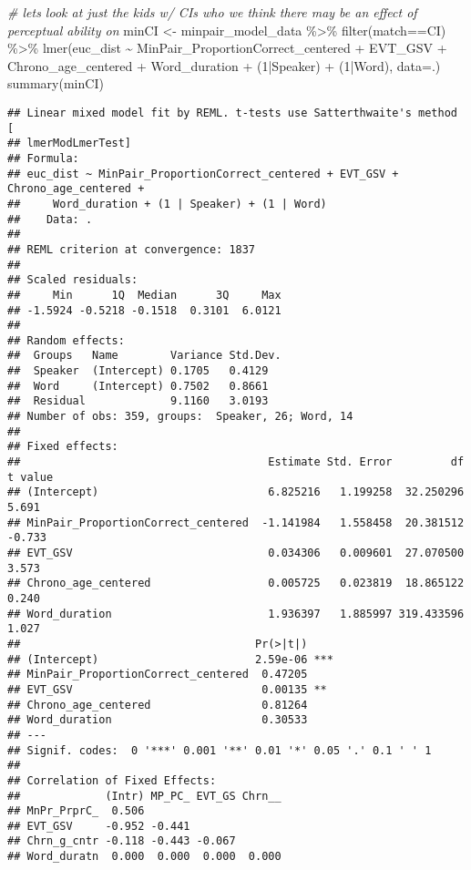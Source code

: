 \documentclass[
]{article}
\newenvironment{Shaded}{\begin{snugshade}}{\end{snugshade}}
\newcommand{\AttributeTok}[1]{\textcolor[rgb]{0.77,0.63,0.00}{#1}}
\newcommand{\CommentTok}[1]{\textcolor[rgb]{0.56,0.35,0.01}{\textit{#1}}}
\newcommand{\DecValTok}[1]{\textcolor[rgb]{0.00,0.00,0.81}{#1}}
\newcommand{\FunctionTok}[1]{\textcolor[rgb]{0.00,0.00,0.00}{#1}}
\newcommand{\NormalTok}[1]{#1}
\newcommand{\OtherTok}[1]{\textcolor[rgb]{0.56,0.35,0.01}{#1}}
\newcommand{\SpecialCharTok}[1]{\textcolor[rgb]{0.00,0.00,0.00}{#1}}
\newcommand{\StringTok}[1]{\textcolor[rgb]{0.31,0.60,0.02}{#1}}
\begin{document}
\begin{Shaded}
\begin{Highlighting}[]
\CommentTok{\# let\textquotesingle{}s look at just the kids w/ CIs who we think there may be an effect of perceptual ability on}
\NormalTok{minCI }\OtherTok{\textless{}{-}}\NormalTok{ minpair\_model\_data }\SpecialCharTok{\%\textgreater{}\%}
  \FunctionTok{filter}\NormalTok{(match}\SpecialCharTok{==}\StringTok{\textquotesingle{}CI\textquotesingle{}}\NormalTok{) }\SpecialCharTok{\%\textgreater{}\%}
  \FunctionTok{lmer}\NormalTok{(euc\_dist }\SpecialCharTok{\textasciitilde{}}\NormalTok{ MinPair\_ProportionCorrect\_centered }\SpecialCharTok{+} 
\NormalTok{         EVT\_GSV }\SpecialCharTok{+}
\NormalTok{         Chrono\_age\_centered }\SpecialCharTok{+} 
\NormalTok{         Word\_duration }\SpecialCharTok{+} 
\NormalTok{         (}\DecValTok{1}\SpecialCharTok{|}\NormalTok{Speaker) }\SpecialCharTok{+} 
\NormalTok{         (}\DecValTok{1}\SpecialCharTok{|}\NormalTok{Word), }
       \AttributeTok{data=}\NormalTok{.) }
\FunctionTok{summary}\NormalTok{(minCI)}
\end{Highlighting}
\end{Shaded}

\begin{verbatim}
## Linear mixed model fit by REML. t-tests use Satterthwaite's method [
## lmerModLmerTest]
## Formula: 
## euc_dist ~ MinPair_ProportionCorrect_centered + EVT_GSV + Chrono_age_centered +  
##     Word_duration + (1 | Speaker) + (1 | Word)
##    Data: .
## 
## REML criterion at convergence: 1837
## 
## Scaled residuals: 
##     Min      1Q  Median      3Q     Max 
## -1.5924 -0.5218 -0.1518  0.3101  6.0121 
## 
## Random effects:
##  Groups   Name        Variance Std.Dev.
##  Speaker  (Intercept) 0.1705   0.4129  
##  Word     (Intercept) 0.7502   0.8661  
##  Residual             9.1160   3.0193  
## Number of obs: 359, groups:  Speaker, 26; Word, 14
## 
## Fixed effects:
##                                      Estimate Std. Error         df t value
## (Intercept)                          6.825216   1.199258  32.250296   5.691
## MinPair_ProportionCorrect_centered  -1.141984   1.558458  20.381512  -0.733
## EVT_GSV                              0.034306   0.009601  27.070500   3.573
## Chrono_age_centered                  0.005725   0.023819  18.865122   0.240
## Word_duration                        1.936397   1.885997 319.433596   1.027
##                                    Pr(>|t|)    
## (Intercept)                        2.59e-06 ***
## MinPair_ProportionCorrect_centered  0.47205    
## EVT_GSV                             0.00135 ** 
## Chrono_age_centered                 0.81264    
## Word_duration                       0.30533    
## ---
## Signif. codes:  0 '***' 0.001 '**' 0.01 '*' 0.05 '.' 0.1 ' ' 1
## 
## Correlation of Fixed Effects:
##             (Intr) MP_PC_ EVT_GS Chrn__
## MnPr_PrprC_  0.506                     
## EVT_GSV     -0.952 -0.441              
## Chrn_g_cntr -0.118 -0.443 -0.067       
## Word_duratn  0.000  0.000  0.000  0.000
\end{verbatim}
\end{document}
